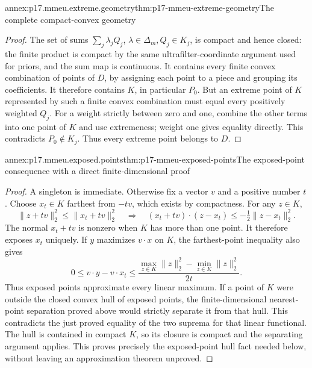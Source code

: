\begin{annexitem}{annex:p17.mmeu.extreme.geometry}{thm:p17-mmeu-extreme-geometry}{The complete compact-convex geometry}
\begin{proof}
The set of sums \(\sum_j\lambda_jQ_j\),
\(\lambda\in\Delta_m,Q_j\in K_j\), is compact
and hence closed: the finite product is
compact by the same ultrafilter-coordinate
argument used for priors, and the sum map
is continuous. It contains every finite
convex combination of points of \(D\),
by assigning each point to a piece and
grouping its coefficients. It therefore
contains \(K\), in particular \(P_0\).
But an extreme point of \(K\) represented
by such a finite convex combination must
equal every positively weighted \(Q_j\).
For a weight strictly between zero and
one, combine the other terms into one
point of \(K\) and use extremeness;
weight one gives equality directly.
This contradicts \(P_0\notin K_j\).
Thus every extreme point belongs to \(D\).
\end{proof}
\end{annexitem}

\begin{annexitem}{annex:p17.mmeu.exposed.points}{thm:p17-mmeu-exposed-points}{The exposed-point consequence with a direct finite-dimensional proof}
\begin{proof}
A singleton is immediate. Otherwise fix
a vector \(v\) and a positive number \(t\).
Choose \(x_t\in K\) farthest from \(-tv\),
which exists by compactness.
For any \(z\in K\),
\[
 \|z+tv\|_2^2\leq\|x_t+tv\|_2^2
 \quad\Longrightarrow\quad
 (x_t+tv)\cdot(z-x_t)\leq-\tfrac12\|z-x_t\|_2^2.
\]
The normal \(x_t+tv\) is nonzero when
\(K\) has more than one point.
It therefore exposes \(x_t\) uniquely.
If \(y\) maximizes \(v\cdot x\) on \(K\),
the farthest-point inequality also gives
\[
 0\leq v\cdot y-v\cdot x_t
       \leq\frac{\max_{z\in K}\|z\|_2^2
                      -\min_{z\in K}\|z\|_2^2}{2t}.
\]
Thus exposed points approximate every
linear maximum. If a point of \(K\)
were outside the closed convex hull
of exposed points, the finite-dimensional
nearest-point separation proved above
would strictly separate it from that
hull. This contradicts the just proved
equality of the two suprema for that
linear functional. The hull is contained
in compact \(K\), so its closure is
compact and the separating argument
applies. This proves precisely the
exposed-point hull fact needed below,
without leaving an approximation
theorem unproved.
\end{proof}
\end{annexitem}

